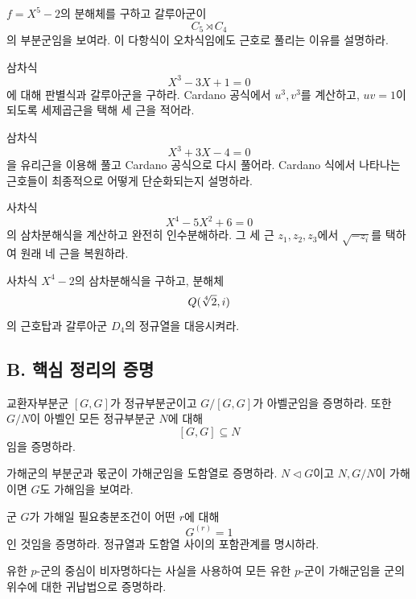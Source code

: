\begin{exercise}
$f=X^5-2$의 분해체를 구하고 갈루아군이
\[
  C_5\rtimes C_4
\]
의 부분군임을 보여라. 이 다항식이 오차식임에도 근호로 풀리는 이유를 설명하라.
\end{exercise}

\begin{exercise}[*]
삼차식
\[
  X^3-3X+1=0
\]
에 대해 판별식과 갈루아군을 구하라. Cardano 공식에서 $u^3,v^3$를 계산하고, $uv=1$이 되도록 세제곱근을 택해 세 근을 적어라.
\end{exercise}

\begin{exercise}
삼차식
\[
  X^3+3X-4=0
\]
을 유리근을 이용해 풀고 Cardano 공식으로 다시 풀어라. Cardano 식에서 나타나는 근호들이 최종적으로 어떻게 단순화되는지 설명하라.
\end{exercise}

\begin{exercise}[*]
사차식
\[
  X^4-5X^2+6=0
\]
의 삼차분해식을 계산하고 완전히 인수분해하라. 그 세 근 $z_1,z_2,z_3$에서 $\sqrt{-z_i}$를 택하여 원래 네 근을 복원하라.
\end{exercise}

\begin{exercise}
사차식 $X^4-2$의 삼차분해식을 구하고, 분해체
\[
  Q(\sqrt[4]{2},i)
\]
의 근호탑과 갈루아군 $D_4$의 정규열을 대응시켜라.
\end{exercise}

\subsection*{B. 핵심 정리의 증명}

\begin{exercise}[*]
교환자부분군 $[G,G]$가 정규부분군이고 $G/[G,G]$가 아벨군임을 증명하라. 또한 $G/N$이 아벨인 모든 정규부분군 $N$에 대해
\[
  [G,G]\subseteq N
\]
임을 증명하라.
\end{exercise}

\begin{exercise}
가해군의 부분군과 몫군이 가해군임을 도함열로 증명하라. $N\triangleleft G$이고 $N,G/N$이 가해이면 $G$도 가해임을 보여라.
\end{exercise}

\begin{exercise}[*]
군 $G$가 가해일 필요충분조건이 어떤 $r$에 대해
\[
  G^{(r)}=1
\]
인 것임을 증명하라. 정규열과 도함열 사이의 포함관계를 명시하라.
\end{exercise}

\begin{exercise}
유한 $p$-군의 중심이 비자명하다는 사실을 사용하여 모든 유한 $p$-군이 가해군임을 군의 위수에 대한 귀납법으로 증명하라.
\end{exercise}

